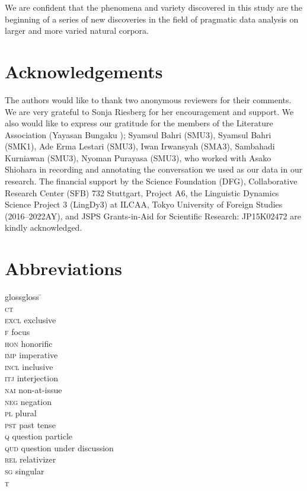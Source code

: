 \documentclass[output=paper
,modfonts
,nonflat]{langsci/langscibook}
\begin{document}
\largerpage 
We are confident that the phenomena and variety discovered in this study are the beginning of a series of new discoveries in the field of pragmatic data analysis on larger and more varied natural corpora. 

\section*{Acknowledgements}
The authors would like to thank two anonymous reviewers for their comments. We are very grateful to Sonja Riesberg for her encouragement and support. We also would like to express our gratitude for the members of the  Literature Association (Yayasan Bungaku ); Syamsul Bahri (SMU3), Syamsul Bahri (SMK1), Ade Erma Lestari (SMU3), Iwan Irwansyah (SMA3), Sambahadi Kurniawan (SMU3), Nyoman Purayasa (SMU3), who worked with Asako Shiohara in recording  and annotating the conversation we used as our data in our research. The financial support by the  Science Foundation (DFG), Collaborative Research Center (SFB) 732 Stuttgart, Project A6,  the Linguistic Dynamics Science Project 3 (LingDy3) at ILCAA, Tokyo University of Foreign Studies (2016--2022AY), and JSPS Grants-in-Aid for Scientific Research: JP15K02472 are kindly acknowledged.

\section*{Abbreviations}

\begin{multicols}{2}
	\begin{tabbing}
		glossgloss \= \kill
		\textsc{\sq} \> \\
		\textsc{ct} \> \\
		\textsc{excl} \> exclusive\\
		\textsc{f}  \> focus\\
		\textsc{hon} \> honorific\\
		\textsc{imp} \> imperative\\
		\textsc{incl} \> inclusive\\
		\textsc{itj} \> interjection\\
		\textsc{nai} \> non-at-issue\\
		\textsc{neg} \> negation\\
		\textsc{pl} \> plural\\
		\textsc{pst} \> past tense\\
		\textsc{q} \> question particle\\
		\textsc{qud} \> question under discussion\\
		\textsc{rel} \> relativizer\\
		\textsc{sg} \> singular\\
		\textsc{t}  \> \\
	\end{tabbing}
\end{multicols}

\sloppy
\printbibliography[heading=subbibliography,notkeyword=this]
\end{document}
